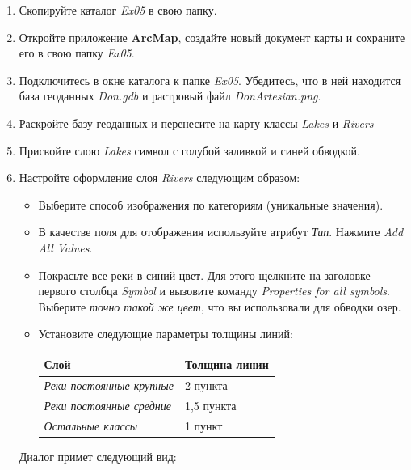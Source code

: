 \documentclass[]{book}
\theoremstyle{definition}
\theoremstyle{definition}
\theoremstyle{definition}
\theoremstyle{remark}
\begin{document}
\begin{enumerate}
\def\labelenumi{\arabic{enumi}.}
\item
  Скопируйте каталог \emph{Ex05} в свою папку.
\item
  Откройте приложение \textbf{ArcMap}, создайте новый документ карты и
  сохраните его в свою папку \emph{Ex05}.
\item
  Подключитесь в окне каталога к папке \emph{Ex05}. Убедитесь, что в ней
  находится база геоданных \emph{Don.gdb} и растровый файл
  \emph{DonArtesian.png}.
\item
  Раскройте базу геоданных и перенесите на карту классы \emph{Lakes} и
  \emph{Rivers}
\item
  Присвойте слою \emph{Lakes} символ с голубой заливкой и синей
  обводкой.
\item
  Настройте оформление слоя \emph{Rivers} следующим образом:

  \begin{itemize}
  \item
    Выберите способ изображения по категориям (уникальные значения).
  \item
    В качестве поля для отображения используйте атрибут \emph{Тип}.
    Нажмите \emph{Add All Values}.
  \item
    Покрасьте все реки в синий цвет. Для этого щелкните на заголовке
    первого столбца \emph{Symbol} и вызовите команду \emph{Properties
    for all symbols}. Выберите \emph{точно такой же цвет}, что вы
    использовали для обводки озер.
  \item
    Установите следующие параметры толщины линий:

    \begin{longtable}[]{@{}ll@{}}
    \toprule
    Слой & Толщина линии\tabularnewline
    \midrule
    \endhead
    \emph{Реки постоянные крупные} & 2 пункта\tabularnewline
    \emph{Реки постоянные средние} & 1,5 пункта\tabularnewline
    \emph{Остальные классы} & 1 пункт\tabularnewline
    \bottomrule
    \end{longtable}
  \end{itemize}

  Диалог примет следующий вид:


\end{enumerate}
\end{document}
